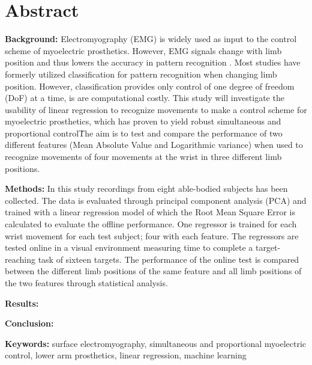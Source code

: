 \section{Abstract}

\textbf{Background:} Electromyography (EMG) is widely used as input to the control scheme of myoelectric prosthetics. However, EMG signals change with limb position and thus lowers the accuracy in pattern recognition \cite{Fougner2010}.%
Most studies have formerly utilized classification for pattern recognition when changing limb position.  
However, classification provides only control of one degree of freedom (DoF) at a time, is are computational costly. This study will investigate the usability of linear regression to recognize movements to make a control scheme for myoelectric prosthetics, which has proven to yield robust simultaneous and proportional control\cite{hahne2014}\. The aim is to test and compare the performance of two different features (Mean Absolute Value and Logarithmic variance) when used to recognize movements of four movements at the wrist in three different limb positions. 


\textbf{Methods:} In this study recordings from eight able-bodied subjects has been collected. The data is evaluated through principal component analysis (PCA) and trained with a linear regression model of which the Root Mean Square Error is calculated to evaluate the offline performance. One regressor is trained for each wrist movement for each test subject; four with each feature. The regressors are tested online in a visual environment measuring time to complete a target-reaching task of sixteen targets. The performance of the online test is compared between the different limb positions of the same feature and all limb positions of the two features through statistical analysis.


\textbf{Results:} 


\textbf{Conclusion:} 


\textbf{Keywords:} surface electromyography, simultaneous and proportional myoelectric control, lower arm prosthetics, linear regression, machine learning %
